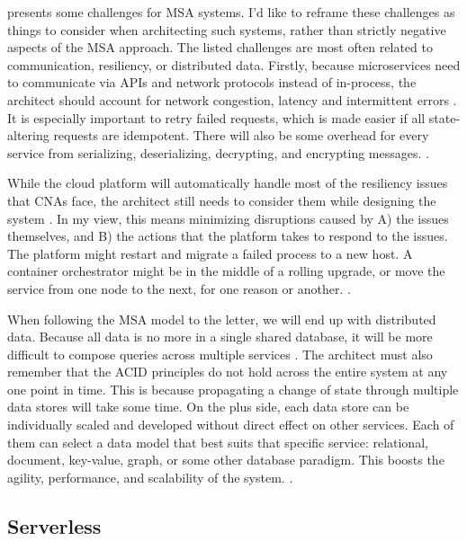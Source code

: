 \documentclass[utf8,english]{gradu3}
\begin{document}
\textcite{Microsoft2022-CNA} presents some challenges for MSA systems.  I'd like
to reframe these challenges as things to consider when architecting such
systems, rather than strictly negative aspects of the MSA approach. The listed
challenges are most often related to communication, resiliency, or
distributed data. Firstly, because microservices need to communicate via APIs and network
protocols instead of in-process, the architect should account for network
congestion, latency and intermittent errors
\parencite{Microsoft2022-Communication}. It is especially important to retry
failed requests, which is made easier if all state-altering requests are
idempotent. There will also be some overhead for every service from serializing,
deserializing, decrypting, and encrypting messages.
\parencite{Microsoft2022-Communication}.

While the cloud platform will automatically handle most of the resiliency issues
that CNAs face, the architect still needs to consider them while designing the
system \parencite{Microsoft2022-Resiliency}. In my view, this means minimizing
disruptions caused by A) the issues themselves, and B) the actions that the
platform takes to respond to the issues. The platform might restart and
migrate a failed process to a new host. A container orchestrator might
be in the middle of a rolling upgrade, or move the service from one node to
the next, for one reason or another. \parencite{Microsoft2022-Resiliency}.

When following the MSA model to the letter, we will end up with distributed
data. Because all data is no more in a single shared database, it will be more
difficult to compose queries across multiple services
\parencite{Microsoft2022-Data}. The architect must also remember that the ACID
principles do not hold across the entire system at any one point in time. This
is because propagating a change of state through multiple data stores will take
some time. On the plus side, each data store can be individually scaled and
developed without direct effect on other services. Each of them can select a
data model that best suits that specific service: relational, document,
key-value, graph, or some other database paradigm. This boosts the agility,
performance, and scalability of the system.  \parencite{Microsoft2022-Data}.


\subsection{Serverless}
\end{document}
